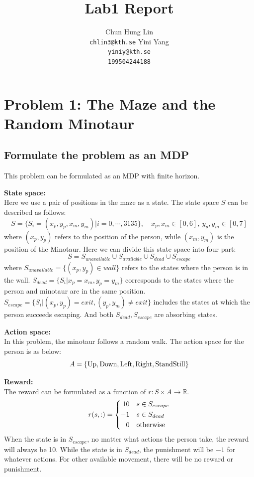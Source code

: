 \documentclass{article}
\title{Lab1 Report}
\author{
  Chun Hung Lin \\
  \texttt{chlin3@kth.se}
  \And
  Yini Yang \\
  \texttt{yiniy@kth.se} \\
  \texttt{199504244188}
}
\begin{document}
\maketitle

\section{Problem 1: The Maze and the Random Minotaur}
\subsection{Formulate the problem as an MDP}
This problem can be formulated as an MDP with finite horizon.
\newline

\textbf{State space:} \\
Here we use a pair of positions in the maze as a state. The state space $S$ can be described as follows:
$$S=\{S_i=(x_p,y_p,x_m,y_m)|i=0,\cdots,3135\}, \quad x_p,x_m\in [0,6],\  y_p,y_m\in [0,7]$$
where $(x_p,y_p)$ refers to the position of the person, while $(x_m,y_m)$ is the position of the Minotaur.
Here we can divide this state space into four part:
$$S=S_{unavailable}\cup S_{available}\cup S_{dead}\cup S_{escape}$$
where $S_{unavailable}=\{(x_p,y_p)\in wall\}$ refers to the states where the person is in the wall. 
$S_{dead}=\{S_i|x_p=x_m,y_p=y_m\}$ corresponds to the states where the person and minotaur are in the same position. 
$S_{escape}=\{S_i|(x_p,y_p)=exit,(y_p,y_m)\neq exit\}$ includes the states at which the person succeeds escaping.
And both $S_{dead}, S_{escape}$ are absorbing states.
\newline

\textbf{Action space:} \\
In this problem, the minotaur follows a random walk. The action space for the person is as below:
$$A=\{\textup{Up},\textup{Down},\textup{Left},\textup{Right},\textup{StandStill}\}$$
\newline

\textbf{Reward:} \\
The reward can be formulated as a function of $r: S\times A\rightarrow \mathbb{R}$.
$$r(s,:)=\left\{\begin{aligned}
 10 \quad &s\in S_{escape} \\
 -1 \quad &s\in S_{dead} \\
 0 \quad &\textup{otherwise}
\end{aligned}\right.$$
When the state is in $S_{escape}$, no matter what actions the person take, the reward will always be 10. 
While the state is in $S_{dead}$, the punishment will be $-1$ for whatever actions. 
For other available movement, there will be no reward or punishment.
\newline
\end{document}
